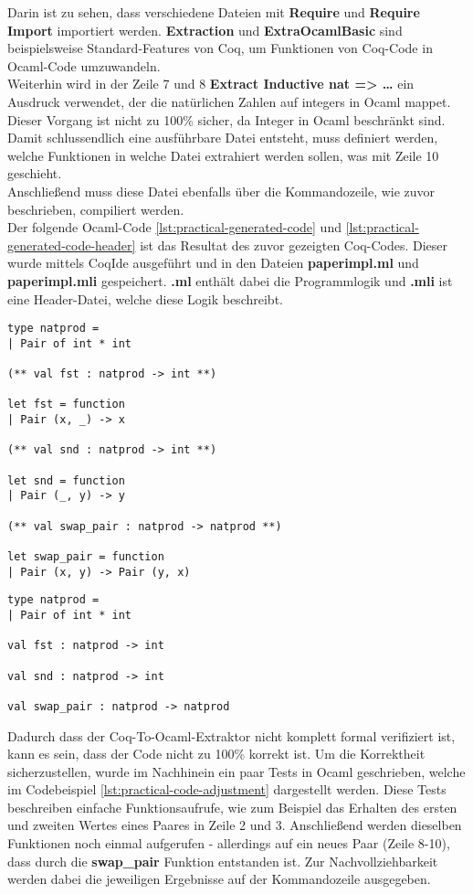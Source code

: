Darin ist zu sehen, dass verschiedene Dateien mit \textbf{Require} und \textbf{Require Import} importiert werden. \textbf{Extraction} und \textbf{ExtraOcamlBasic} sind beispielsweise Standard-Features von Coq, um Funktionen von Coq-Code in Ocaml-Code umzuwandeln.\\
Weiterhin wird in der Zeile 7 und 8 \textbf{Extract Inductive nat => \dots} ein Ausdruck verwendet, der die natürlichen Zahlen  auf integers in Ocaml mappet. Dieser Vorgang ist nicht zu 100\% sicher, da Integer in Ocaml beschränkt sind.
Damit schlussendlich eine ausführbare Datei entsteht, muss definiert werden, welche Funktionen in welche Datei extrahiert werden sollen, was mit Zeile 10 geschieht.\\
Anschließend muss diese Datei ebenfalls über die Kommandozeile, wie zuvor beschrieben, compiliert werden.
\\
Der folgende Ocaml-Code \ref{lst:practical-generated-code} und \ref{lst:practical-generated-code-header} ist das Resultat des zuvor gezeigten Coq-Codes. Dieser wurde mittels CoqIde ausgeführt und in den Dateien \textbf{paperimpl.ml} und \textbf{paperimpl.mli} gespeichert. \textbf{.ml} enthält dabei die Programmlogik und \textbf{.mli} ist eine Header-Datei, welche diese Logik beschreibt.
\begin{lstlisting}[language=coq,firstnumber=1,caption=Ocaml Code Resultat (paperimpl.ml),label=lst:practical-generated-code]
type natprod =
| Pair of int * int

(** val fst : natprod -> int **)

let fst = function
| Pair (x, _) -> x

(** val snd : natprod -> int **)

let snd = function
| Pair (_, y) -> y

(** val swap_pair : natprod -> natprod **)

let swap_pair = function
| Pair (x, y) -> Pair (y, x)
\end{lstlisting}
\begin{lstlisting}[language=coq,firstnumber=1,caption=Ocaml Code Resultat (paperimpl.mli),label=lst:practical-generated-code-header]
type natprod =
| Pair of int * int

val fst : natprod -> int

val snd : natprod -> int

val swap_pair : natprod -> natprod
\end{lstlisting}
Dadurch dass der Coq-To-Ocaml-Extraktor nicht komplett formal verifiziert ist, kann es sein, dass der Code nicht zu 100\% korrekt ist. Um die Korrektheit sicherzustellen, wurde im Nachhinein ein paar Tests in Ocaml geschrieben, welche im Codebeispiel \ref{lst:practical-code-adjustment} dargestellt werden. Diese Tests beschreiben einfache Funktionsaufrufe, wie zum Beispiel das Erhalten des ersten und zweiten Wertes eines Paares in Zeile 2 und 3. Anschließend werden dieselben Funktionen noch einmal aufgerufen - allerdings auf ein neues Paar (Zeile 8-10), dass durch die \textbf{swap\_pair} Funktion entstanden ist. Zur Nachvollziehbarkeit werden dabei die jeweiligen Ergebnisse auf der Kommandozeile ausgegeben.
